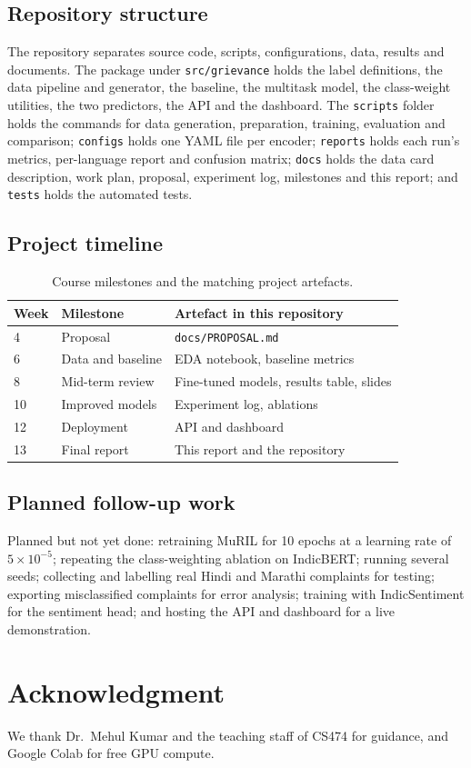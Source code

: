 \documentclass[conference]{IEEEtran}
\begin{document}
\subsection{Repository structure}
The repository separates source code, scripts, configurations, data, results and documents. The package under \texttt{src/grievance} holds the label definitions, the data pipeline and generator, the baseline, the multitask model, the class-weight utilities, the two predictors, the API and the dashboard.
The \texttt{scripts} folder holds the commands for data generation, preparation, training, evaluation and comparison; \texttt{configs} holds one YAML file per encoder; \texttt{reports} holds each run's metrics, per-language report and confusion matrix;
\texttt{docs} holds the data card description, work plan, proposal, experiment log, milestones and this report; and \texttt{tests} holds the automated tests.
\subsection{Project timeline}
\begin{table}[h]
\caption{Course milestones and the matching project artefacts.}
\label{tab:time}
\centering
\footnotesize
\begin{tabular}{@{}p{1.0cm}p{2.7cm}p{3.6cm}@{}}
\toprule
Week & Milestone & Artefact in this repository \\
\midrule
4 & Proposal & \texttt{docs/PROPOSAL.md} \\
6 & Data and baseline & EDA notebook, baseline metrics \\
8 & Mid-term review & Fine-tuned models, results table, slides \\
10 & Improved models & Experiment log, ablations \\
12 & Deployment & API and dashboard \\
13 & Final report & This report and the repository \\
\bottomrule
\end{tabular}
\end{table}

\subsection{Planned follow-up work}
Planned but not yet done: retraining MuRIL for 10 epochs at a learning rate of $5{\times}10^{-5}$; repeating the class-weighting ablation on IndicBERT; running several seeds; collecting and labelling real Hindi and Marathi complaints for testing;
exporting misclassified complaints for error analysis; training with IndicSentiment for the sentiment head; and hosting the API and dashboard for a live demonstration.

\section*{Acknowledgment}
We thank Dr.\ Mehul Kumar and the teaching staff of CS474 for guidance, and Google Colab for free GPU compute.



\end{document}
